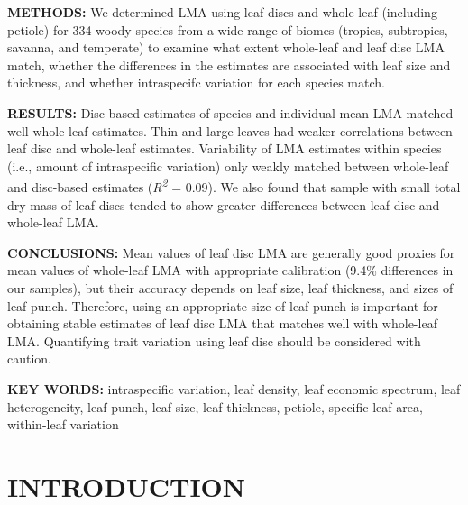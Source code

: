 \documentclass[
  12pt,
  a4paper,
,tablecaptionabove
]{scrartcl}
\begin{document}
\textbf{METHODS:}
We determined LMA using leaf discs and whole-leaf (including petiole) for 334 woody species from a wide range of biomes (tropics, subtropics, savanna, and temperate) to examine what extent whole-leaf and leaf disc LMA match, whether the differences in the estimates are associated with leaf size and thickness, and whether intraspecifc variation for each species match.

\textbf{RESULTS:}
Disc-based estimates of species and individual mean LMA matched well whole-leaf estimates.
Thin and large leaves had weaker correlations between leaf disc and whole-leaf estimates.
Variability of LMA estimates within species (i.e., amount of intraspecific variation) only weakly matched between whole-leaf and disc-based estimates (\emph{R\textsuperscript{2}} = 0.09).
We also found that sample with small total dry mass of leaf discs tended to show greater differences between leaf disc and whole-leaf LMA.

\textbf{CONCLUSIONS:}
Mean values of leaf disc LMA are generally good proxies for mean values of whole-leaf LMA with appropriate calibration (9.4\% differences in our samples), but their accuracy depends on leaf size, leaf thickness, and sizes of leaf punch.
Therefore, using an appropriate size of leaf punch is important for obtaining stable estimates of leaf disc LMA that matches well with whole-leaf LMA.
Quantifying trait variation using leaf disc should be considered with caution.

\textbf{KEY WORDS:}
intraspecific variation,
leaf density,
leaf economic spectrum,
leaf heterogeneity,
leaf punch,
leaf size,
leaf thickness,
petiole,
specific leaf area,
within-leaf variation

\hypertarget{introduction}{%
\section{INTRODUCTION}\label{introduction}}
\end{document}
